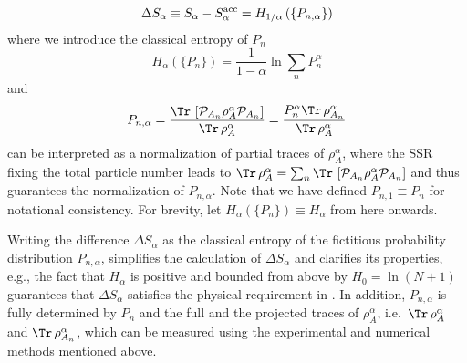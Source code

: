 %
\begin{equation}
    \Delta S_{\alpha}\equiv  S_{\alpha} - S_{\alpha}^{{\rm acc}} = H_{{1}/{\alpha}}\left(\{P_{n,\alpha}\}\right)
\label{eq:S_alpha_acc5}
\end{equation}
%
where we introduce the classical \ren entropy of $P_n$
%
\begin{equation}
    H_{\alpha}\left(\{P_n\}\right)=\frac{1}{1-\alpha}\ln\sum_n P_n^{\alpha} 
\label{eq:Halpha}
\end{equation}
%
and
%
\begin{equation}
    P_{n,\alpha}=\frac{\Tr\, \left[{\mathcal{P}}_{A_{n}} \rho_A^{\alpha} {\mathcal{P}}_{A_{n}}\right]}{\Tr\, \rho_A^{\alpha}}=\frac{ P_n^\alpha\Tr\, \rho_{A_n}^{\alpha}}{\Tr\, \rho_A^{\alpha}}
\label{eq:Pna}
\end{equation}
%
can be interpreted as a normalization of partial traces of $\rho_A^{\alpha}$, where the SSR fixing the total particle number leads to $\Tr\, \rho_A^{\alpha}=\sum_n \Tr\, \left[{\mathcal{P}}_{A_{n}} \rho_A^{\alpha} {\mathcal{P}}_{A_{n}}\right]$ and thus guarantees the normalization of $P_{n,\alpha}$. Note that we have defined $P_{n,1} \equiv P_n$ for notational consistency. For brevity, let $H_{\alpha}(\{P_n\}) \equiv H_{\alpha}$ from here onwards. 

Writing the difference $\Delta S_{\alpha}$ as the classical \ren entropy of the fictitious probability distribution $P_{n,\alpha}$, simplifies the calculation of $\Delta S_{\alpha}$ and clarifies its properties, e.g., the fact that $H_{\alpha}$  is positive and bounded from above by $ H_{0}=\ln(N+1)$ guarantees that $\Delta S_{\alpha}$ satisfies the physical requirement in . \cite{Barghathi:2018oe} In addition, $P_{n,\alpha}$ is fully determined by $P_n$ and the full and the projected traces of $\rho_A^{\alpha}$, i.e.~$\Tr\, \rho_{A}^{\alpha}$ and $\Tr\, \rho_{A_n}^{\alpha}$, which can be measured using the experimental and numerical methods mentioned above.    